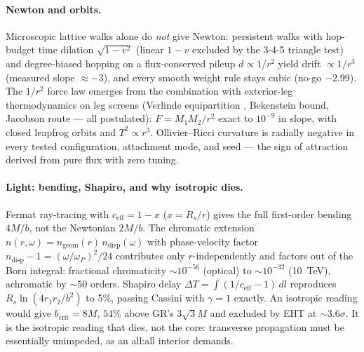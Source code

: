 \documentclass[11pt]{article}
\begin{document}
\paragraph{Newton and orbits.}
Microscopic lattice walks alone do \emph{not} give Newton: persistent walks
with hop-budget time dilation $\sqrt{1-v^2}$ (linear $1-v$ excluded by the
3-4-5 triangle test) and degree-biased hopping on a flux-conserved pileup
$d \propto 1/r^2$ yield drift $\propto 1/r^3$ (measured slope $\approx -3$),
and every smooth weight rule stays cubic (no-go $-2.99$). The $1/r^2$ force
law emerges from the combination with exterior-leg thermodynamics on leg
screens (Verlinde equipartition \cite{Verlinde11}, Bekenstein bound, Jacobson route \cite{Jacobson95} --- all postulated):
$F = M_1M_2/r^2$ exact to $10^{-9}$ in slope, with closed leapfrog orbits and
$T^2 \propto r^3$. Ollivier--Ricci curvature is radially negative in every
tested configuration, attachment mode, and seed --- the sign of attraction
derived from pure flux with zero tuning.

\paragraph{Light: bending, Shapiro, and why isotropic dies.}
Fermat ray-tracing with $c_{\mathrm{eff}} = 1 - x$ ($x = R_s/r$) gives the
full first-order bending $4M/b$, not the Newtonian $2M/b$. The chromatic
extension $n(r,\omega) = n_{\mathrm{geom}}(r)\,n_{\mathrm{disp}}(\omega)$ with
phase-velocity factor $n_{\mathrm{disp}} - 1 = (\omega/\omega_P)^2/24$
contributes only $r$-independently and factors out of the Born integral:
fractional chromaticity $\sim 10^{-56}$ (optical) to $\sim 10^{-32}$
(10~TeV), achromatic by $\sim 50$ orders. Shapiro delay
$\Delta T = \int (1/c_{\mathrm{eff}} - 1)\,dl$ reproduces
$R_s \ln(4r_1r_2/b^2)$ to 5\%, passing Cassini \cite{Bertotti03} with $\gamma = 1$ exactly.
An isotropic reading would give $b_{\mathrm{crit}} = 8M$, $54\%$ above GR's
$3\sqrt{3}M$ and excluded by EHT \cite{EHT19} at $\sim 3.6\sigma$. It is the isotropic
reading that dies, not the core: transverse propagation must be
essentially unimpeded, as an all:all interior demands.
\end{document}
